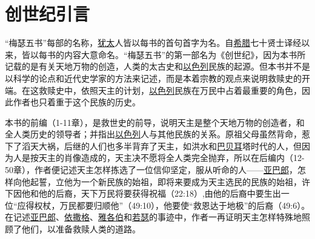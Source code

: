 \chapter{创世纪引言}

“梅瑟五书”每部的名称，\uline{犹太}人皆以每书的首句首字为名。自\uline{希腊}七十贤士译经以来，皆以每书的内容大意命名。“梅瑟五书”的第一部名为《创世纪》，因为本书所记载的是有关天地万物的创造，人类的太古史和\uline{以色列}民族的起源。但本书并不是以科学的论点和近代史学家的方法来记述，而是本着宗教的观点来说明救赎史的开端。在这救赎史中，依照天主的计划，\uline{以色列}民族在万民中占着最重要的角色，因此作者也只着重于这个民族的历史。

本书的前编（1-11章），是救世史的前导，说明天主是整个天地万物的创造者，和全人类历史的领导者；并指出\uline{以色列}人与其他民族的关系。原祖父母虽然背命，惹下了滔天大祸，后继的人们也多半背弃了天主，如洪水和\uline{巴贝耳}塔时代的人，但因为人是按天主的肖像造成的，天主决不愿将全人类完全抛弃，所以在后编内（12-50章），作者便记述天主怎样拣选了一位信仰坚定，服从听命的人——\uline{亚巴郎}，怎样向他起誓，立他为一个新民族的始祖，即将来要成为天主选民的民族的始祖，许下因他和他的后裔，天下万民将要获得祝福（22:18）,由他的后裔中要生出一位“应得权杖，万民都要归顺他”（49:10），他要使“救恩达于地极”的后裔（49:6）。在记述\uline{亚巴郎}、\uline{依撒格}、\uline{雅各伯}和\uline{若瑟}的事迹中，作者一再证明天主怎样特殊地照顾了他们，以准备救赎人类的道路。